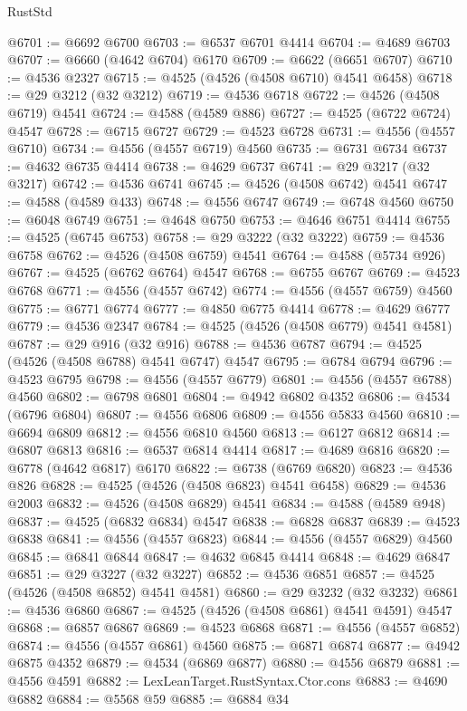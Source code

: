 \begin{lexlean}{RustStd}
\begin{coremodule}
{\begin{coremodule}
{{{{{{{{{{{{{{{{{{{{{{{{{{{{{{{{{{{{{{{{{{{{{{{{{{{{{{{@6701 := @6692 @6700
@6703 := @6537 @6701 @4414
@6704 := @4689 @6703
@6707 := @6660 (@4642 @6704) @6170
@6709 := @6622 (@6651 @6707)
@6710 := @4536 @2327
@6715 := @4525 (@4526 (@4508 @6710) @4541 @6458)
@6718 := @29 @3212 (@32 @3212)
@6719 := @4536 @6718
@6722 := @4526 (@4508 @6719) @4541
@6724 := @4588 (@4589 @886)
@6727 := @4525 (@6722 @6724) @4547
@6728 := @6715 @6727
@6729 := @4523 @6728
@6731 := @4556 (@4557 @6710)
@6734 := @4556 (@4557 @6719) @4560
@6735 := @6731 @6734
@6737 := @4632 @6735 @4414
@6738 := @4629 @6737
@6741 := @29 @3217 (@32 @3217)
@6742 := @4536 @6741
@6745 := @4526 (@4508 @6742) @4541
@6747 := @4588 (@4589 @433)
@6748 := @4556 @6747
@6749 := @6748 @4560
@6750 := @6048 @6749
@6751 := @4648 @6750
@6753 := @4646 @6751 @4414
@6755 := @4525 (@6745 @6753)
@6758 := @29 @3222 (@32 @3222)
@6759 := @4536 @6758
@6762 := @4526 (@4508 @6759) @4541
@6764 := @4588 (@5734 @926)
@6767 := @4525 (@6762 @6764) @4547
@6768 := @6755 @6767
@6769 := @4523 @6768
@6771 := @4556 (@4557 @6742)
@6774 := @4556 (@4557 @6759) @4560
@6775 := @6771 @6774
@6777 := @4850 @6775 @4414
@6778 := @4629 @6777
@6779 := @4536 @2347
@6784 := @4525 (@4526 (@4508 @6779) @4541 @4581)
@6787 := @29 @916 (@32 @916)
@6788 := @4536 @6787
@6794 := @4525 (@4526 (@4508 @6788) @4541 @6747) @4547
@6795 := @6784 @6794
@6796 := @4523 @6795
@6798 := @4556 (@4557 @6779)
@6801 := @4556 (@4557 @6788) @4560
@6802 := @6798 @6801
@6804 := @4942 @6802 @4352
@6806 := @4534 (@6796 @6804)
@6807 := @4556 @6806
@6809 := @4556 @5833 @4560
@6810 := @6694 @6809
@6812 := @4556 @6810 @4560
@6813 := @6127 @6812
@6814 := @6807 @6813
@6816 := @6537 @6814 @4414
@6817 := @4689 @6816
@6820 := @6778 (@4642 @6817) @6170
@6822 := @6738 (@6769 @6820)
@6823 := @4536 @826
@6828 := @4525 (@4526 (@4508 @6823) @4541 @6458)
@6829 := @4536 @2003
@6832 := @4526 (@4508 @6829) @4541
@6834 := @4588 (@4589 @948)
@6837 := @4525 (@6832 @6834) @4547
@6838 := @6828 @6837
@6839 := @4523 @6838
@6841 := @4556 (@4557 @6823)
@6844 := @4556 (@4557 @6829) @4560
@6845 := @6841 @6844
@6847 := @4632 @6845 @4414
@6848 := @4629 @6847
@6851 := @29 @3227 (@32 @3227)
@6852 := @4536 @6851
@6857 := @4525 (@4526 (@4508 @6852) @4541 @4581)
@6860 := @29 @3232 (@32 @3232)
@6861 := @4536 @6860
@6867 := @4525 (@4526 (@4508 @6861) @4541 @4591) @4547
@6868 := @6857 @6867
@6869 := @4523 @6868
@6871 := @4556 (@4557 @6852)
@6874 := @4556 (@4557 @6861) @4560
@6875 := @6871 @6874
@6877 := @4942 @6875 @4352
@6879 := @4534 (@6869 @6877)
@6880 := @4556 @6879
@6881 := @4556 @4591
@6882 := LexLeanTarget.RustSyntax.Ctor.cons
@6883 := @4690 @6882
@6884 := @5568 @59
@6885 := @6884 @34
}}}}}}}}}}}}}}}}}}}}}}}}}}}}}}}}}}}}}}}}}}}}}}}}}}}}}}}
\end{coremodule}}
\end{coremodule}
\end{lexlean}

